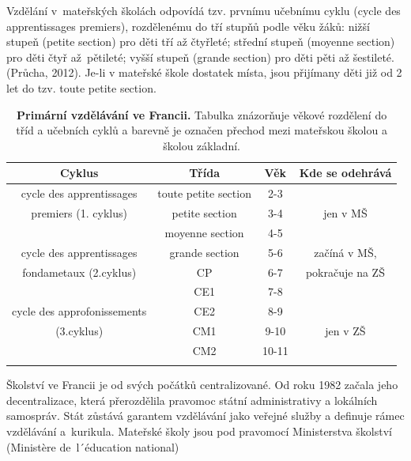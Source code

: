 		Vzdělání v mateřských školách odpovídá tzv. prvnímu učebnímu cyklu (cycle des apprentissages premiers), rozdělenému do tří stupňů podle věku žáků: nižší stupeň (petite section) pro děti tří až čtyřleté; střední stupeň (moyenne section) pro děti čtyř až pětileté; vyšší stupeň (grande section) pro děti pěti až šestileté.
		(Průcha, 2012). 
		Je-li v mateřské škole dostatek místa, jsou přijímany děti již od 2 let do tzv. toute petite section. 

\begin{spacing}{1.0}
\begin{table}[h]
	\small
	\begin{center}
	\begin{tabular}{|c|c|c|c|}
		\hline
		\rowcolor{grey}
		\textbf{Cyklus}				& \textbf{Třída}		& \textbf{Věk}	& \textbf{Kde se odehrává}	\\
		\hline
		\hline
		\rowcolor{grey!10}
		cycle des apprentissages	& toute petite section 	& 2-3 		&				\\ \rowcolor{grey!10}
		premiers (1. cyklus)		& petite section 		& 3-4 		& jen v MŠ 		\\ \rowcolor{grey!10}
									& moyenne section 		& 4-5 		& 				\\ \rowcolor{grey!10}
		\hline
		cycle des apprentissages 	& grande section 		& 5-6 		& začíná v MŠ, 		\\ \rowcolor{grey!10}
		fondametaux (2.cyklus) 		& CP 					& 6-7 		& pokračuje na ZŠ 	\\ \rowcolor{grey!10}
									& CE1 					& 7-8 		& 					\\ \rowcolor{grey!10}
		\hline
		cycle des approfonissements & CE2 					& 8-9 		&					\\ \rowcolor{grey!10}
		(3.cyklus)					& CM1 					& 9-10 		& jen v ZŠ 			\\ \rowcolor{grey!10}
									& CM2 					& 10-11 	& 					\\ \rowcolor{grey!10}
		\hline
	\end{tabular}
	\end{center}
	\caption{ \textbf{Primární vzdělávání ve Francii.} Tabulka znázorňuje věkové rozdělení do tříd a učebních cyklů a barevně je označen přechod mezi mateřskou školou a školou základní. 
	}
	\label{tab:rozdeleniTridCR}
\end{table}
\end{spacing}
		Školství ve Francii je od svých počátků centralizované. Od roku 1982 začala jeho decentralizace, která přerozdělila pravomoc státní administrativy a lokálních samospráv. Stát zůstává garantem vzdělávání jako veřejné služby a definuje rámec vzdělávání a kurikula. Mateřské školy jsou pod pravomocí Ministerstva školství (Ministère de l´éducation national)

